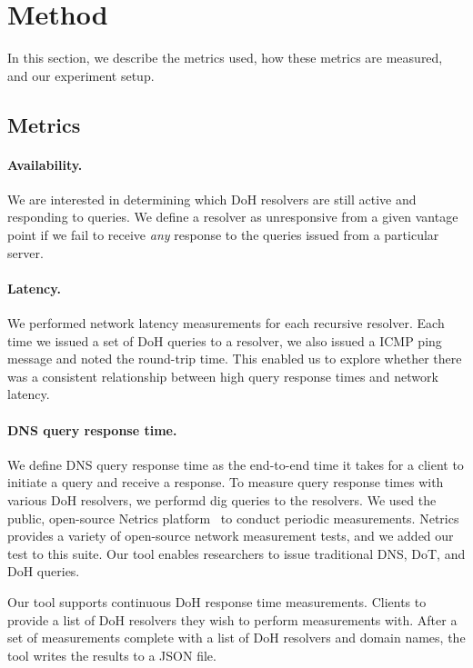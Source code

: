 \section{Method}\label{sec:method} In this section, we describe the metrics
used, how these metrics are measured, and our experiment setup.

\subsection{Metrics} 

\paragraph{Availability.} We are interested in determining which DoH
resolvers are still active and responding to queries.  We define a resolver as
unresponsive from a given vantage point if we fail to receive \emph{any}
response to the queries issued from a particular server.

\paragraph{Latency.} We
performed network latency measurements for each recursive resolver.  Each time
we issued a set of DoH queries to a resolver, we also issued a ICMP ping
message and noted the round-trip time.  This enabled us to explore
whether there was a consistent relationship between high query response times
and network latency.

\paragraph{DNS query response time.} We define DNS query response time as the
end-to-end time it takes for a client to initiate a query and receive a
response.  To measure query response times with various DoH resolvers, we
performd dig queries to the resolvers. We used the public, open-source Netrics
platform~\cite{netrics} to conduct periodic measurements. Netrics
provides a variety of open-source network measurement tests, and we added our 
test to this suite. Our tool enables researchers to issue
traditional DNS, DoT, and DoH queries.

Our tool supports continuous DoH response time measurements. Clients to provide
a list of DoH resolvers they wish to perform measurements with. After a set of 
measurements complete with a list of DoH resolvers and domain names, the tool
writes the results to a JSON file.

